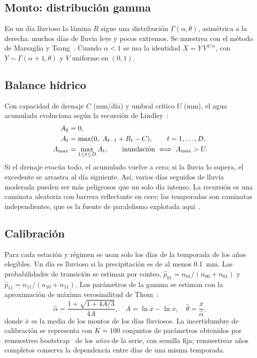 \subsection{Monto: distribución gamma}

En un día lluvioso la lámina $R$ sigue una distribución $\Gamma(\alpha,\theta)$, asimétrica a la derecha: muchos días de lluvia leve y pocos extremos. Se muestrea con el método de Marsaglia y Tsang~\cite{marsaglia2000}. Cuando $\alpha < 1$ se usa la identidad $X = Y\,V^{1/\alpha}$, con $Y\sim\Gamma(\alpha+1,\theta)$ y $V$ uniforme en $(0,1)$.

\subsection{Balance hídrico}

Con capacidad de drenaje $C$ (mm/día) y umbral crítico $U$ (mm), el agua acumulada evoluciona según la recursión de Lindley~\cite{lindley1952}:
\begin{align}
A_0 &= 0, \nonumber\\
A_t &= \max(0,\; A_{t-1} + R_t - C), \qquad t = 1,\dots,D, \label{eq:lindley}\\
A_{\max} &= \max_{1\le t\le D} A_t, \qquad \text{inundación} \iff A_{\max} > U. \nonumber
\end{align}
Si el drenaje evacúa todo, el acumulado vuelve a cero; si la lluvia lo supera, el excedente se arrastra al día siguiente. Así, varios días seguidos de lluvia moderada pueden ser más peligrosos que un solo día intenso. La recursión es una caminata aleatoria con barrera reflectante en cero; las temporadas son caminatas independientes, que es la fuente de paralelismo explotada aquí~\cite{youssef1993}.

\subsection{Calibración}

Para cada estación y régimen se usan solo los días de la temporada de los años elegibles. Un día es lluvioso si la precipitación es de al menos \qty{0.1}{\milli\metre}. Las probabilidades de transición se estiman por conteo, $\hat p_{01} = n_{01}/(n_{00}+n_{01})$ y $\hat p_{11} = n_{11}/(n_{10}+n_{11})$. Los parámetros de la gamma se estiman con la aproximación de máxima verosimilitud de Thom~\cite{thom1958}:
\begin{equation}
\hat\alpha = \frac{1 + \sqrt{1 + 4A/3}}{4A}, \quad A = \ln\bar{x} - \overline{\ln x}, \quad \hat\theta = \frac{\bar{x}}{\hat\alpha},
\label{eq:thom}
\end{equation}
donde $\bar x$ es la media de los montos de los días lluviosos. La incertidumbre de calibración se representa con $K = 100$ conjuntos de parámetros obtenidos por remuestreo bootstrap~\cite{efron1979} de los \emph{años} de la serie, con semilla fija; remuestrear años completos conserva la dependencia entre días de una misma temporada.

